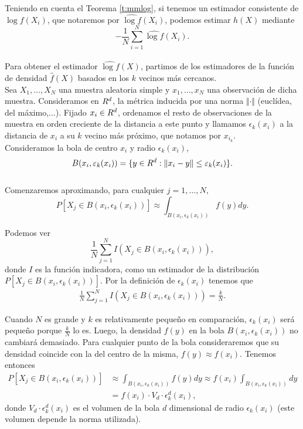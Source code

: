\documentclass[12pt,a4paper]{report} %
\let\mathbb\relax
\theoremstyle{definition}
\begin{document}
Teniendo en cuenta el Teorema \ref{t:mmlog}, si tenemos un estimador consistente de $\log f(X_i)$, que notaremos por $\widehat{\log f}(X_i)$, podemos estimar $h(X)$ mediante\[
-\frac{1}{N}\sum_{i=1}^N\widehat{\log f}(X_i).
\]\\[-10pt]

Para obtener el estimador $\widehat{\log f}(X)$, partimos de los estimadores de la función de densidad $\hat{f}(X)$ basados en los $k$ vecinos más cercanos.\\

Sea $X_1,\dots,X_N$ una muestra aleatoria simple y $x_1,\dots, x_N$ una observación de dicha muestra. Consideramos en $\mathbb{R}^d$, la métrica inducida por una norma $\Vert \cdot \Vert$ (euclídea, del máximo,...). Fijado $x_i\in \mathbb{R}^d$, ordenamos el resto de observaciones de la muestra en orden creciente de la distancia a este punto y llamamos $\epsilon_k(x_i)$ a la distancia de $x_i$ a su $k$ vecino más próximo, que notamos por $x_{i_k}$.\\

Consideramos la bola de centro $x_i$ y radio $\epsilon_k(x_i)$,\[
B(x_i, \epsilon_k(x_i)) = \{y \in \R^d: \Vert x_i - y\Vert \leq \epsilon_k(x_i)\}.\]\\[-15pt]

Comenzaremos aproximando, para cualquier $j=1,\dots, N$,\[
P[X_j\in B(x_i,\epsilon_k(x_i))] \approx \int_{B(x_i,\epsilon_k(x_i))}f(y)dy.
\]

Podemos ver \[
\frac{1}{N} \sum_{j=1}^NI\left(X_j\in B(x_i,\epsilon_k(x_i))\right),\]donde $I$ es la función indicadora, como un estimador de la distribución $P[X_j\in B(x_i,\epsilon_k(x_i))]$. Por la definición de $\epsilon_k(x_i)$ tenemos que \begin{align}\label{eq:knn-ind}
 \frac{1}{N} \sum_{j=1}^NI\left(X_j\in B\left(x_i,\epsilon_k(x_i)\right)\right) = \frac{k}{N}.
\end{align}

Cuando $N$ es grande y $k$ es relativamente pequeño en comparación, $\epsilon_k(x_i)$ será pequeño porque $\frac{k}{N}$ lo es. Luego, la densidad $f(y)$ en la bola $B(x_i,\epsilon_k(x_i))$ no cambiará demasiado. Para cualquier punto de la bola consideraremos que su densidad coincide con la del centro de la misma, $f(y)\approx f(x_i)$. Tenemos entonces\begin{align*}
P[X_j\in B(x_i,\epsilon_k(x_i))] &\approx \int_{B(x_i,\epsilon_k(x_i))}f(y)dy\approx f(x_i) \int_{B(x_i,\epsilon_k(x_i))}dy\\[3pt] &= f(x_i)\cdot V_d \cdot \epsilon^d_k(x_i),
\end{align*}
donde $V_d\cdot \epsilon^d_k(x_i)$ es el volumen de la bola $d$ dimensional de radio $\epsilon_k(x_i)$ (este volumen depende la norma utilizada).\\
\end{document}
